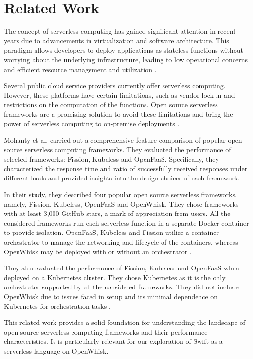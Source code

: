 \chapter{Related Work}
\label{chap:relatedwork}

The concept of serverless computing has gained significant attention in recent years due to advancements in virtualization and software architecture. This paradigm allows developers to deploy applications as stateless functions without worrying about the underlying infrastructure, leading to low operational concerns and efficient resource management and utilization \cite{mohanty2018evaluation}.

Several public cloud service providers currently offer serverless computing. However, these platforms have certain limitations, such as vendor lock-in and restrictions on the computation of the functions. Open source serverless frameworks are a promising solution to avoid these limitations and bring the power of serverless computing to on-premise deployments \cite{mohanty2018evaluation}.

Mohanty et al. \cite{mohanty2018evaluation} carried out a comprehensive feature comparison of popular open source serverless computing frameworks. They evaluated the performance of selected frameworks: Fission, Kubeless and OpenFaaS. Specifically, they characterized the response time and ratio of successfully received responses under different loads and provided insights into the design choices of each framework.

In their study, they described four popular open source serverless frameworks, namely, Fission, Kubeless, OpenFaaS and OpenWhisk. They chose frameworks with at least 3,000 GitHub stars, a mark of appreciation from users. All the considered frameworks run each serverless function in a separate Docker container to provide isolation. OpenFaaS, Kubeless and Fission utilize a container orchestrator to manage the networking and lifecycle of the containers, whereas OpenWhisk may be deployed with or without an orchestrator \cite{mohanty2018evaluation}.

They also evaluated the performance of Fission, Kubeless and OpenFaaS when deployed on a Kubernetes cluster. They chose Kubernetes as it is the only orchestrator supported by all the considered frameworks. They did not include OpenWhisk due to issues faced in setup and its minimal dependence on Kubernetes for orchestration tasks \cite{mohanty2018evaluation}.

This related work provides a solid foundation for understanding the landscape of open source serverless computing frameworks and their performance characteristics. It is particularly relevant for our exploration of Swift as a serverless language on OpenWhisk.

